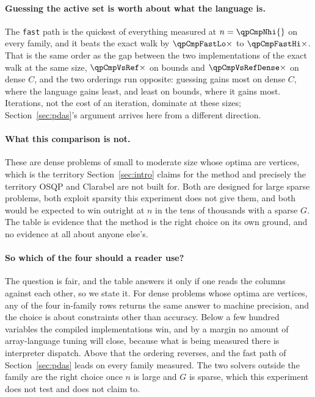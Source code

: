 \paragraph{Guessing the active set is worth about what the language is.} The
\texttt{fast} path is the quickest of everything measured at
$n = \qpCmpNhi{}$ on every family, and it beats the exact walk by
$\qpCmpFastLo\times$ to $\qpCmpFastHi\times$. That is the same order as the gap
between the two implementations of the exact walk at the same size,
$\qpCmpVsRef\times$ on bounds and $\qpCmpVsRefDense\times$ on dense $C$, and the
two orderings run opposite: guessing gains most on dense $C$, where the language
gains least, and least on bounds, where it gains most. Iterations, not the cost of
an iteration, dominate at these sizes; Section~\ref{sec:pdas}'s argument arrives
here from a different direction.

\paragraph{What this comparison is not.} These are dense problems of small to
moderate size whose optima are vertices, which is the territory
Section~\ref{sec:intro} claims for the method and precisely the territory OSQP and
Clarabel are not built for. Both are designed for large sparse problems, both
exploit sparsity this experiment does not give them, and both would be expected to
win outright at $n$ in the tens of thousands with a sparse $G$. The table is
evidence that the method is the right choice on its own ground, and no evidence at
all about anyone else's.

\paragraph{So which of the four should a reader use?} The question is fair, and the
table answers it only if one reads the columns against each other, so we state it.
For dense problems whose optima are vertices, any of the four in-family rows returns
the same answer to machine precision, and the choice is about constraints other than
accuracy. Below a few hundred variables the compiled implementations win, and by a
margin no amount of array-language tuning will close, because what is being measured
there is interpreter dispatch. Above that the ordering reverses, and the fast path of
Section~\ref{sec:pdas} leads on every family measured. The two solvers outside the
family are the right choice once $n$ is large and $G$ is sparse, which this
experiment does not test and does not claim to.

